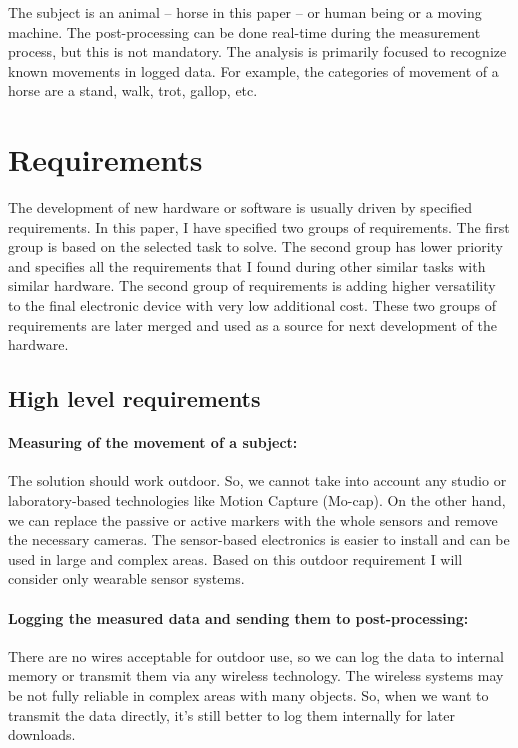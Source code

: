 The subject is an animal -- horse in this paper -- or human being or a moving machine. The post-processing can be done real-time during the measurement process, but this is not mandatory. The analysis is primarily focused to recognize known movements in logged data. For example, the categories of movement of a horse are a stand, walk, trot, gallop, etc.

\section{Requirements}
\label{HWrequirements}
The development of new hardware or software is usually driven by specified requirements. In this paper, I have specified two groups of requirements. The first group is based on the selected task to solve. The second group has lower priority and specifies all the requirements that I found during other similar tasks with similar hardware. The second group of requirements is adding higher versatility to the final electronic device with very low additional cost. These two groups of requirements are later merged and used as a source for next development of the hardware.

\subsection{High level requirements}

\paragraph{Measuring of the movement of a subject:} The solution should work outdoor. So, we cannot take into account any studio or laboratory-based technologies like Motion Capture (Mo-cap). On the other hand, we can replace the passive or active markers with the whole sensors and remove the necessary cameras. The sensor-based electronics is easier to install and can be used in large and complex areas. Based on this outdoor requirement I will consider only wearable sensor systems.

\paragraph{Logging the measured data and sending them to post-processing:} There are no wires acceptable for outdoor use, so we can log the data to internal memory or transmit them via any wireless technology. The wireless systems may be not fully reliable in complex areas with many objects. So, when we want to transmit the data directly, it's still better to log them internally for later downloads.

